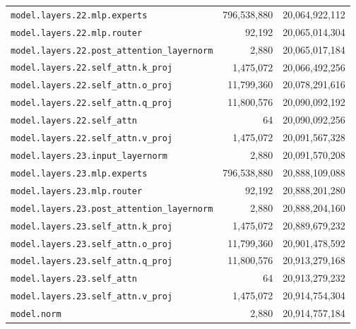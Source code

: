 \documentclass[10pt,a4paper]{article}
\theoremstyle{definition}
\begin{document}
\begin{appendices}
\begin{longtable}{p{9.5cm}rr}
\texttt{model.\allowbreak{}layers.\allowbreak{}22.\allowbreak{}mlp.\allowbreak{}experts} & 796,538,880 & 20,064,922,112 \\
\texttt{model.\allowbreak{}layers.\allowbreak{}22.\allowbreak{}mlp.\allowbreak{}router} & 92,192 & 20,065,014,304 \\
\texttt{model.\allowbreak{}layers.\allowbreak{}22.\allowbreak{}post\_attention\_layernorm} & 2,880 & 20,065,017,184 \\
\texttt{model.\allowbreak{}layers.\allowbreak{}22.\allowbreak{}self\_attn.\allowbreak{}k\_proj} & 1,475,072 & 20,066,492,256 \\
\texttt{model.\allowbreak{}layers.\allowbreak{}22.\allowbreak{}self\_attn.\allowbreak{}o\_proj} & 11,799,360 & 20,078,291,616 \\
\texttt{model.\allowbreak{}layers.\allowbreak{}22.\allowbreak{}self\_attn.\allowbreak{}q\_proj} & 11,800,576 & 20,090,092,192 \\
\texttt{model.\allowbreak{}layers.\allowbreak{}22.\allowbreak{}self\_attn} & 64 & 20,090,092,256 \\
\texttt{model.\allowbreak{}layers.\allowbreak{}22.\allowbreak{}self\_attn.\allowbreak{}v\_proj} & 1,475,072 & 20,091,567,328 \\
\texttt{model.\allowbreak{}layers.\allowbreak{}23.\allowbreak{}input\_layernorm} & 2,880 & 20,091,570,208 \\
\texttt{model.\allowbreak{}layers.\allowbreak{}23.\allowbreak{}mlp.\allowbreak{}experts} & 796,538,880 & 20,888,109,088 \\
\texttt{model.\allowbreak{}layers.\allowbreak{}23.\allowbreak{}mlp.\allowbreak{}router} & 92,192 & 20,888,201,280 \\
\texttt{model.\allowbreak{}layers.\allowbreak{}23.\allowbreak{}post\_attention\_layernorm} & 2,880 & 20,888,204,160 \\
\texttt{model.\allowbreak{}layers.\allowbreak{}23.\allowbreak{}self\_attn.\allowbreak{}k\_proj} & 1,475,072 & 20,889,679,232 \\
\texttt{model.\allowbreak{}layers.\allowbreak{}23.\allowbreak{}self\_attn.\allowbreak{}o\_proj} & 11,799,360 & 20,901,478,592 \\
\texttt{model.\allowbreak{}layers.\allowbreak{}23.\allowbreak{}self\_attn.\allowbreak{}q\_proj} & 11,800,576 & 20,913,279,168 \\
\texttt{model.\allowbreak{}layers.\allowbreak{}23.\allowbreak{}self\_attn} & 64 & 20,913,279,232 \\
\texttt{model.\allowbreak{}layers.\allowbreak{}23.\allowbreak{}self\_attn.\allowbreak{}v\_proj} & 1,475,072 & 20,914,754,304 \\
\texttt{model.\allowbreak{}norm} & 2,880 & 20,914,757,184 \\
\end{longtable}
\end{appendices}
\end{document}
